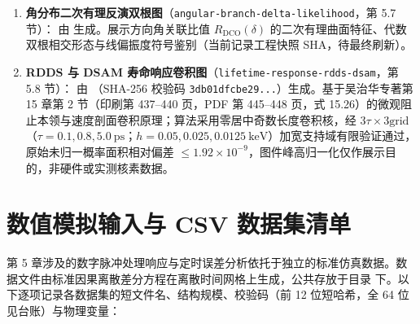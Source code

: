 \begin{enumerate}[label=(\arabic*),leftmargin=2em]
    \vspace{1ex}
    \item \textbf{角分布二次有理反演双根图}（\texttt{angular-branch-delta-likelihood}，第 5.7 节）：
    由  生成。展示方向角关联比值 $R_{\mathrm{DCO}}(\delta)$ 的二次有理曲面特征、代数双根相交形态与线偏振度符号鉴别（当前记录工程快照 SHA，待最终刷新）。
    \vspace{1ex}
    \item \textbf{RDDS 与 DSAM 寿命响应卷积图}（\texttt{lifetime-response-rdds-dsam}，第 5.8 节）：
    由 （SHA-256 校验码 \texttt{3db01dfcbe29...}）生成。基于吴治华专著第 15 章第 2 节（印刷第 437–440 页，PDF 第 445–448 页，式 15.26）的微观阻止本领与速度剖面卷积原理；算法采用零居中奇数长度卷积核，经 $3\tau \times 3\text{grid}$（$\tau=0.1, 0.8, 5.0\ \mathrm{ps}$；$h=0.05, 0.025, 0.0125\ \mathrm{keV}$）加宽支持域有限验证通过，原始未归一概率面积相对偏差 $\le 1.92 \times 10^{-9}$，图件峰高归一化仅作展示目的，非硬件或实测核素数据。
\end{enumerate}

\section{数值模拟输入与 CSV 数据集清单}\label{sec:appF-datasets}

第 5 章涉及的数字脉冲处理响应与定时误差分析依托于独立的标准仿真数据。数据文件由标准因果离散差分方程在离散时间网格上生成，公共存放于目录  下。以下逐项记录各数据集的短文件名、结构规模、校验码（前 12 位短哈希，全 64 位见台账）与物理变量：

